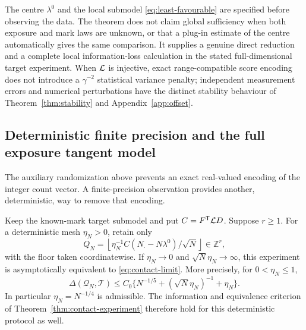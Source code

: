 The centre $\lambda^0$ and the local submodel \eqref{eq:least-favourable} are specified before observing the data. The theorem does not claim global sufficiency when both exposure and mark laws are unknown, or that a plug-in estimate of the centre automatically gives the same comparison. It supplies a genuine direct reduction and a complete local information-loss calculation in the stated full-dimensional target experiment. When $\mathcal L$ is injective, exact range-compatible score encoding does not introduce a $\gamma^{-2}$ statistical variance penalty; independent measurement errors and numerical perturbations have the distinct stability behaviour of Theorem~\ref{thm:stability} and Appendix~\ref{app:offset}.


\subsection{Deterministic finite precision and the full exposure tangent model}
The auxiliary randomization above prevents an exact real-valued encoding of the integer count vector. A finite-precision observation provides another, deterministic, way to remove that encoding.
\begin{theorem}\label{thm:quantized-score}
Keep the known-mark target submodel and put $C=F^{\mathsf T}\mathcal L D$. Suppose $r\ge1$. For a deterministic mesh $\eta_N>0$, retain only
\[
 Q_N=\left\lfloor \eta_N^{-1}
          C(N_\cdot-N\lambda^0)/\sqrt N\right\rfloor\in\mathbb Z^r,
\]
with the floor taken coordinatewise. If $\eta_N\to0$ and
$\sqrt N\eta_N\to\infty$, this experiment is asymptotically equivalent to \eqref{eq:contact-limit}. More precisely, for $0<\eta_N\le1$,
\begin{equation}\label{eq:quantized-bound}
 \Delta(\mathcal Q_N,\mathcal T)
 \le C_0\{N^{-1/5}+(\sqrt N\eta_N)^{-1}+\eta_N\}.
\end{equation}
In particular $\eta_N=N^{-1/4}$ is admissible. The information and equivalence criterion of Theorem~\ref{thm:contact-experiment} therefore hold for this deterministic protocol as well.
\end{theorem}
